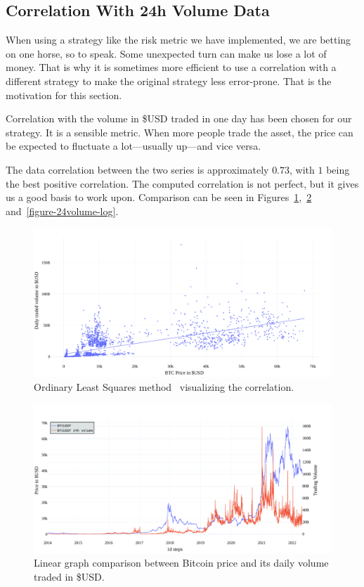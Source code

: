 \subsection*{Correlation With 24h Volume Data}
\label{subsection-24hvolume-correlation}
When using a strategy like the risk metric we have implemented, we are betting on one horse, so to speak. Some unexpected turn can make us lose a lot of money. That is why it is sometimes more efficient to use a correlation with a different strategy to make the original strategy less error-prone. That is the motivation for this section.

Correlation with the volume in \$USD traded in one day has been chosen for our strategy. It is a sensible metric. When more people trade the asset, the price can be expected to fluctuate a lot---usually up---and vice versa.

The data correlation between the two series is approximately $0.73$, with $1$ being the best positive correlation. The computed correlation is not perfect, but it gives us a good basis to work upon. Comparison can be seen in Figures~\ref{figure-24volume-ols},~\ref{figure-24volume-lin} and~\ref{figure-24volume-log}.

\begin{figure}[!hbt]
    \centering
    \includegraphics[width=\columnwidth]{figures/24volume-ols.pdf}
    \caption{Ordinary Least Squares method~\cite{wikipedia:ols} visualizing the correlation.}
    \label{figure-24volume-ols}
\end{figure}

\begin{figure}[!hbt]
    \centering
    \includegraphics[width=\columnwidth]{figures/24volume-lin.pdf}
    \caption{Linear graph comparison between Bitcoin price and its daily volume traded in \$USD.}
    \label{figure-24volume-lin}
\end{figure}

